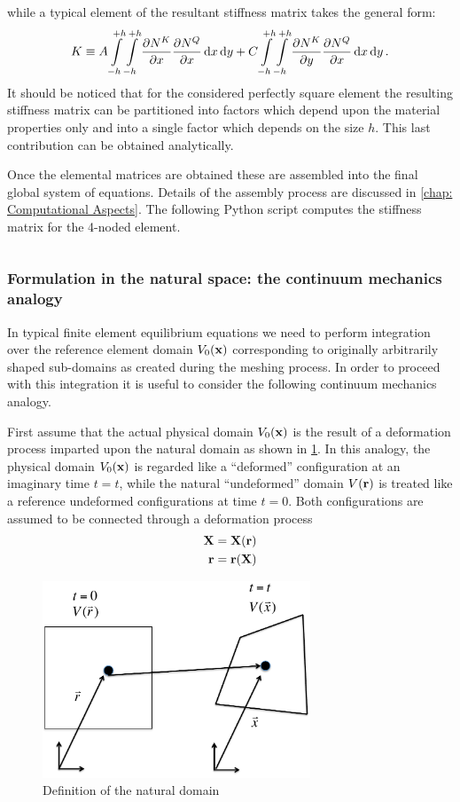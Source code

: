 while a typical element of the resultant stiffness matrix takes the general form:
\[K \equiv A\int\limits_{- h}^{ + h} \int\limits_{-h}^{+h} \pdv{N^K}{x}\pdv{N^Q}{x}\dd{x}\dd{y}  + C\int\limits_{-h}^{+h} \int\limits_{-h}^{+h}\pdv{N^K}{y}\pdv{N^Q}{x}\dd{x}\dd{y}.\]
It should be noticed that for the considered perfectly square element the resulting stiffness matrix can be partitioned into factors which depend upon the material properties only and into a single factor which depends on the size $h$. This last contribution can be obtained analytically.

Once the elemental matrices are obtained these are assembled into the final global system of equations. Details of the assembly process are discussed in \autoref{chap: Computational Aspects}. The following Python script computes the stiffness matrix for the 4-noded element.

\inputminted[]{python}{src/stiff_4nodes.py}

\subsubsection{Formulation in the natural space: the continuum mechanics analogy}
In typical finite element equilibrium equations we need to perform integration over the reference element domain $V_0(\vb{x})$ corresponding to originally arbitrarily shaped sub-domains as created during the meshing process.  In order to proceed with this integration it is useful to consider the following continuum mechanics analogy.

First assume that the actual physical domain $V_0(\vb{x})$ is the result of a deformation process imparted upon the natural domain as shown in \cref{fig:natural domain}. In this analogy, the physical domain $V_0(\vb{x})$ is regarded like a ``deformed'' configuration at an imaginary time $t=t$, while the natural ``undeformed'' domain $V(\vb{r})$   is treated like a reference undeformed configurations at time $t=0$. Both configurations are assumed to be connected through a deformation process
\begin{equation}
\begin{aligned}
\vb{X}&=\vb{X}(\vb{r})\\
\vb{r}&=\vb{r}(\vb{X})
\end{aligned}
\label{eq:motion}
\end{equation}
\begin{figure}[h]
\centering
\includegraphics[width=8cm]{figure1.pdf}
\caption{Definition of the natural domain}
\label{fig:natural domain}
\end{figure} 

